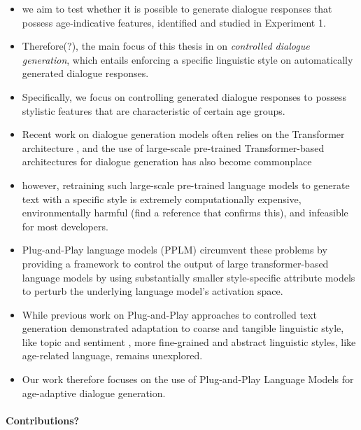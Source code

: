 \begin{itemize}
    \item we aim to test whether it is possible to generate dialogue responses that possess age-indicative features, identified and studied in Experiment 1.
    \item  Therefore(?), the main focus of this thesis in on \textit{controlled dialogue generation}, which entails enforcing a specific linguistic style on automatically generated dialogue responses.
    \item Specifically, we focus on controlling generated dialogue responses to possess stylistic features that are characteristic of certain age groups.
    \item Recent work on dialogue generation models often relies on the Transformer architecture \citep{vaswani2017attention}, and the use of large-scale pre-trained Transformer-based architectures for dialogue generation has also become commonplace \citep{zhang2019dialogpt, brown2020language-models-few-shot-gpt3}
    \item however, retraining such large-scale pre-trained language models to generate text with a specific style is extremely computationally expensive, environmentally harmful (find a reference that confirms this), and infeasible for most developers.
    \item Plug-and-Play language models (PPLM) \citep{dathathri2019plug} circumvent these problems by providing a framework to control the output of large transformer-based language models by using substantially smaller style-specific attribute models to perturb the underlying language model's activation space.
    \item While previous work on Plug-and-Play approaches to controlled text generation demonstrated adaptation to coarse and tangible linguistic style, like topic and sentiment \citep{madotto-etal-2020-plug}, more fine-grained and abstract linguistic styles, like age-related language, remains unexplored. 
    \item Our work therefore focuses on the use of Plug-and-Play Language Models for age-adaptive dialogue generation.
\end{itemize}

\paragraph{Contributions?}

